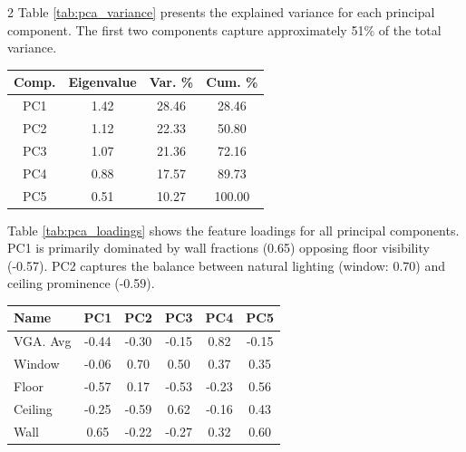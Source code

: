 \documentclass[11pt,a4paper]{article}
\begin{document}
\begin{multicols}{2}
Table \ref{tab:pca_variance} presents the explained variance for each principal component. The first two 
components capture approximately 51\% of the total variance.
\begin{center}
\begin{tabular}{c|c|c|c}
\hline
Comp. & Eigenvalue & Var. \% & Cum. \% \\
\hline
PC1 & 1.42 & 28.46 & 28.46 \\
PC2 & 1.12 & 22.33 & 50.80 \\
PC3 & 1.07 & 21.36 & 72.16 \\
PC4 & 0.88 & 17.57 & 89.73 \\
PC5 & 0.51 & 10.27 & 100.00 \\
\hline
\end{tabular}
\label{tab:pca_variance}
\end{center}
Table \ref{tab:pca_loadings} shows the feature loadings for all principal components. PC1 is primarily 
dominated by wall fractions (0.65) opposing floor visibility (-0.57). PC2 captures the balance between natural lighting (window: 0.70) 
and ceiling prominence (-0.59).

\begin{center}
\begin{tabular}{l|c|c|c|c|c}
\hline
Name & PC1 & PC2 & PC3 & PC4 & PC5 \\
\hline
VGA. Avg & -0.44 & -0.30 & -0.15 & 0.82 & -0.15 \\
Window & -0.06 & 0.70 & 0.50 & 0.37 & 0.35 \\
Floor & -0.57 & 0.17 & -0.53 & -0.23 & 0.56 \\
Ceiling & -0.25 & -0.59 & 0.62 & -0.16 & 0.43 \\
Wall & 0.65 & -0.22 & -0.27 & 0.32 & 0.60 \\
\hline
\end{tabular}
\label{tab:pca_loadings}
\end{center}



\end{multicols}
\end{document}
